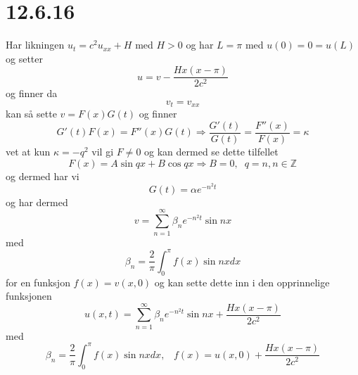 \documentclass{report}
\newcommand{\M}[2]{\mathbb{#1}^{#2}}
\begin{document}
\section*{12.6.16}
Har likningen $u_{t} = c^{2}u_{xx} + H$ med $H > 0$ og har $L=\pi$ med $u(0) = 0 = u(L)$ og setter
\begin{equation}
  \label{eq:20}
  u = v - \frac{Hx(x-\pi)}{2c^{2}}
\end{equation}
og finner da
\begin{equation}
  \label{eq:21}
  v_{t} = v_{xx}
\end{equation}
kan så sette $v = F(x)G(t)$ og finner
\begin{equation}
  \label{eq:22}
  G'(t)F(x) = F''(x)G(t) \Rightarrow \frac{G'(t)}{G(t)} = \frac{F''(x)}{F(x)} = \kappa
\end{equation}
vet at kun $\kappa = -q^{2}$ vil gi $F\neq 0$ og kan dermed se dette tilfellet
\begin{equation}
  \label{eq:23}
  F(x) = A\sin qx + B\cos qx \Rightarrow B=0, \;\; q = n, n \in \M{Z}{}
\end{equation}
og dermed har vi
\begin{equation}
  \label{eq:24}
  G(t) = \alpha e^{-n^{2}t}
\end{equation}
og har dermed
\begin{equation}
  \label{eq:25}
  v = \sum_{n=1}^{\infty} \beta_{n} e^{-n^{2}t} \sin nx
\end{equation}
med
\begin{equation}
  \label{eq:26}
  \beta_{n} = \frac{2}{\pi} \int_{0}^{\pi} f(x) \sin nx dx
\end{equation}
for en funksjon $f(x) = v(x, 0)$ og kan sette dette inn i den opprinnelige funksjonen
\begin{equation}
  \label{eq:27}
  u(x, t) = \sum_{n=1}^{\infty} \beta_{n} e^{-n^{2}t} \sin nx + \frac{Hx(x-\pi)}{2c^{2}}
\end{equation}
med
\begin{equation}
  \label{eq:28}
  \beta_{n} = \frac{2}{\pi} \int_{0}^{\pi} f(x) \sin nx dx, \;\;\;
  f(x) = u(x, 0) + \frac{Hx(x-\pi)}{2c^{2}}
\end{equation}
\end{document}
